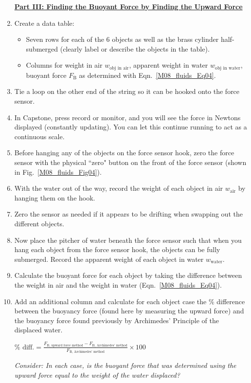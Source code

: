 \begin{enumerate}
\underline{\textbf{Part III: Finding the Buoyant Force by Finding the Upward Force}}

\item Create a data table:
\begin{itemize}
    \item Seven rows for each of the 6 objects as well as the brass cylinder half-submerged (clearly label or describe the objects in the table).
    \item Columns for weight in air $w_\text{obj in air}$, apparent weight in water $w_\text{obj in water}$, buoyant force $F_\text{B}$ as determined with Eqn.~\ref{M08_fluids_Eq04}.
\end{itemize}
\item Tie a loop on the other end of the string so it can be hooked onto the force sensor.
\item In Capstone, press record or monitor, and you will see the force in Newtons displayed (constantly updating). You can let this continue running to act as a continuous scale.
\item Before hanging any of the objects on the force sensor hook, zero the force sensor with the physical ``zero" button on the front of the force sensor (shown in Fig.~\ref{M08_fluids_Fig04}).
\item With the water out of the way, record the weight of each object in air $w_\text{air}$ by hanging them on the hook. 
\item Zero the sensor as needed if it appears to be drifting when swapping out the different objects.
\item Now place the pitcher of water beneath the force sensor such that when you hang each object from the force sensor hook, the objects can be fully submerged. Record the apparent weight of each object in water $w_\text{water}$.
\item Calculate the buoyant force for each object by taking the difference between the weight in air and the weight in water (Eqn.~\ref{M08_fluids_Eq04}).
\item Add an additional column and calculate for each object case the \% difference between the buoyancy force (found here by measuring the upward force) and the buoyancy force found previously by Archimedes' Principle of the displaced water. 

$\% \text{ diff.} = \frac{F_\text{B, upward force method} - F_\text{B, Archimedes' method}}{F_\text{B, Archimedes' method}} \times 100$ 

\textit{Consider: In each case, is the buoyant force that was determined using the upward force equal to the
weight of the water displaced?}



\end{enumerate}





